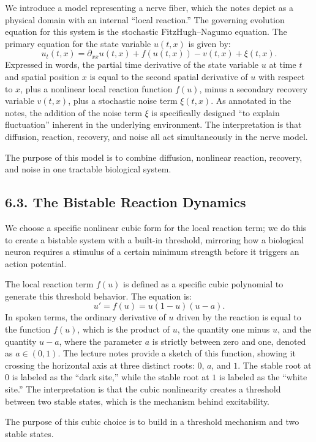\documentclass[11pt]{article}
\theoremstyle{definition}
\theoremstyle{remark}
\begin{document}
We introduce a model representing a nerve fiber, which the notes depict as a physical domain with an internal ``local reaction.'' The governing evolution equation for this system is the stochastic FitzHugh--Nagumo equation. The primary equation for the state variable $u(t,x)$ is given by:
\[
u_t(t,x)=\partial_{xx}u(t,x)+f(u(t,x))-v(t,x)+\xi(t,x).
\]
Expressed in words, the partial time derivative of the state variable $u$ at time $t$ and spatial position $x$ is equal to the second spatial derivative of $u$ with respect to $x$, plus a nonlinear local reaction function $f(u)$, minus a secondary recovery variable $v(t,x)$, plus a stochastic noise term $\xi(t,x)$. As annotated in the notes, the addition of the noise term $\xi$ is specifically designed ``to explain fluctuation'' inherent in the underlying environment.
The interpretation is that diffusion, reaction, recovery, and noise all act simultaneously in the nerve model.

The purpose of this model is to combine diffusion, nonlinear reaction, recovery, and noise in one tractable biological system.

\subsection*{6.3. The Bistable Reaction Dynamics}
We choose a specific nonlinear cubic form for the local reaction term; we do this to create a bistable system with a built-in threshold, mirroring how a biological neuron requires a stimulus of a certain minimum strength before it triggers an action potential.

The local reaction term $f(u)$ is defined as a specific cubic polynomial to generate this threshold behavior. The equation is:
\[
u'=f(u)=u(1-u)(u-a).
\]
In spoken terms, the ordinary derivative of $u$ driven by the reaction is equal to the function $f(u)$, which is the product of $u$, the quantity one minus $u$, and the quantity $u-a$, where the parameter $a$ is strictly between zero and one, denoted as $a\in(0,1)$. The lecture notes provide a sketch of this function, showing it crossing the horizontal axis at three distinct roots: $0$, $a$, and $1$. The stable root at $0$ is labeled as the ``dark site,'' while the stable root at $1$ is labeled as the ``white site.''
The interpretation is that the cubic nonlinearity creates a threshold between two stable states, which is the mechanism behind excitability.

The purpose of this cubic choice is to build in a threshold mechanism and two stable states.
\end{document}
